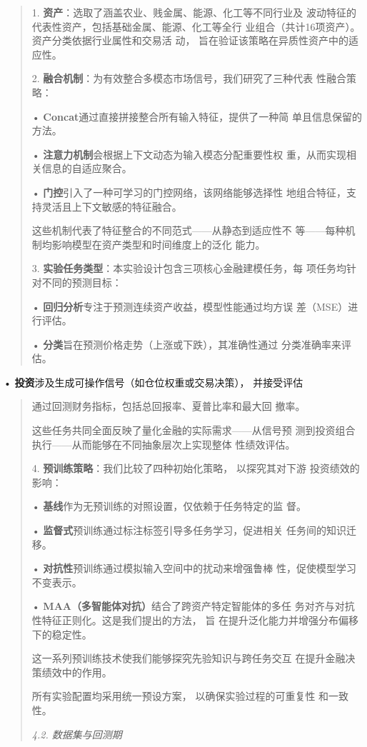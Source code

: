 \begin{quote}
1. \textbf{资产}：选取了涵盖农业、贱金属、能源、化工等不同行业及
波动特征的代表性资产，包括基础金属、能源、化工等全行
业组合（共计16项资产）。资产分类依据行业属性和交易活 动，
旨在验证该策略在异质性资产中的适应性。

2. \textbf{融合机制}：为有效整合多模态市场信号，我们研究了三种代表
性融合策略：

• \textbf{Concat}通过直接拼接整合所有输入特征，提供了一种简
单且信息保留的方法。

• \textbf{注意力机制}会根据上下文动态为输入模态分配重要性权
重，从而实现相关信息的自适应聚合。

• \textbf{门控}引入了一种可学习的门控网络，该网络能够选择性
地组合特征，支持灵活且上下文敏感的特征融合。

这些机制代表了特征整合的不同范式------从静态到适应性不
等------每种机制均影响模型在资产类型和时间维度上的泛化 能力。

3. \textbf{实验任务类型}：本实验设计包含三项核心金融建模任务，每
项任务均针对不同的预测目标：

• \textbf{回归分析}专注于预测连续资产收益，模型性能通过均方误
差（MSE）进行评估。

• \textbf{分类}旨在预测价格走势（上涨或下跌），其准确性通过
分类准确率来评估。
\end{quote}

• \textbf{投资}涉及生成可操作信号（如仓位权重或交易决策）， 并接受评估

\begin{quote}
通过回测财务指标，包括总回报率、夏普比率和最大回 撤率。

这些任务共同全面反映了量化金融的实际需求------从信号预
测到投资组合执行------从而能够在不同抽象层次上实现整体 性绩效评估。

4. \textbf{预训练策略}：我们比较了四种初始化策略， 以探究其对下游
投资绩效的影响：

• \textbf{基线}作为无预训练的对照设置，仅依赖于任务特定的监 督。

• \textbf{监督式}预训练通过标注标签引导多任务学习，促进相关
任务间的知识迁移。

• \textbf{对抗性}预训练通过模拟输入空间中的扰动来增强鲁棒
性，促使模型学习不变表示。

• \textbf{MAA（多智能体对抗）}结合了跨资产特定智能体的多任
务对齐与对抗性特征正则化。这是我们提出的方法， 旨
在提升泛化能力并增强分布偏移下的稳定性。

这一系列预训练技术使我们能够探究先验知识与跨任务交互
在提升金融决策绩效中的作用。

所有实验配置均采用统一预设方案， 以确保实验过程的可重复性 和一致性。

\emph{4.2. 数据集与回测期}
\end{quote}

